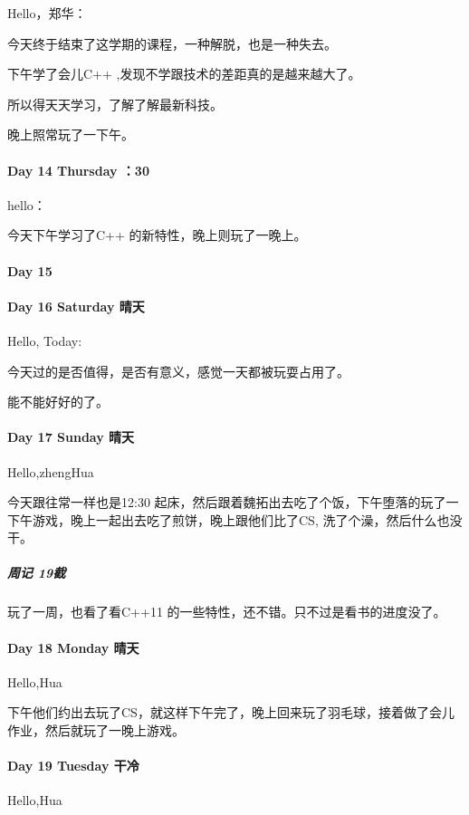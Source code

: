 \documentclass[UTF8,a4paper,8pt]{ctexbook}
\begin{document}
	     Hello，郑华：
	     
	     今天终于结束了这学期的课程，一种解脱，也是一种失去。
	     
	     下午学了会儿C++ ,发现不学跟技术的差距真的是越来越大了。
	     
	     所以得天天学习，了解了解最新科技。
	     
	     晚上照常玩了一下午。
     \paragraph{Day 14  Thursday    ：30 }
	     hello：
	     
	     今天下午学习了C++ 的新特性，晚上则玩了一晚上。
     \paragraph{Day 15      \quad     }
     \paragraph{Day 16  Saturday   \quad  晴天}
	     Hello, Today:
	     
	     今天过的是否值得，是否有意义，感觉一天都被玩耍占用了。
	     
	     能不能好好的了。
     \paragraph{Day 17  Sunday   \quad   晴天  }
	     Hello,zhengHua
	     
	     今天跟往常一样也是12:30 起床，然后跟着魏拓出去吃了个饭，下午堕落的玩了一下午游戏，晚上一起出去吃了煎饼，晚上跟他们比了CS, 洗了个澡，然后什么也没干。
	     
	     \subparagraph{周记 \quad 19截}
	     
	     玩了一周，也看了看C++11 的一些特性，还不错。只不过是看书的进度没了。
	     
     \paragraph{Day 18  Monday    \quad   晴天  }
     
	     Hello,Hua
	     
	     下午他们约出去玩了CS，就这样下午完了，晚上回来玩了羽毛球，接着做了会儿作业，然后就玩了一晚上游戏。
     \paragraph{Day 19  Tuesday   \quad   干冷     }
	     Hello,Hua
	     
\end{document}
